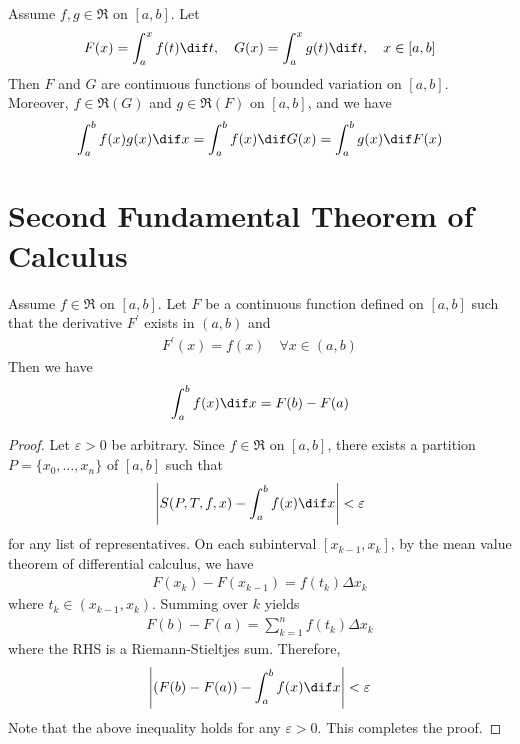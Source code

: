 \documentclass[thmcnt=section, color=blue, 12pt]{my-elegantbook}
\begin{document}
\begin{theorem}
	Assume $f, g \in \mathfrak{R}$ on $[a, b]$.
	Let
	\begin{align*}
		F(x) = \int_a^x f(t) \dif t, \quad
		G(x) = \int_a^x g(t) \dif t, \quad
		x \in [a, b]
	\end{align*}
	Then $F$ and $G$ are continuous functions of bounded variation on $[a, b]$.
	Moreover, $f \in \mathfrak{R}(G)$ and $g \in \mathfrak{R}(F)$ on $[a, b]$,
	and we have
	\begin{align*}
		\int_a^b f(x) g(x) \dif x
		= \int_a^b f(x) \dif G(x)
		= \int_a^b g(x) \dif F(x)
	\end{align*}
\end{theorem}



\section{Second Fundamental Theorem of Calculus}

\begin{theorem} \label{thm:22}
	Assume $f \in \mathfrak{R}$ on $[a, b]$.
	Let $F$ be a continuous function defined on $[a, b]$
	such that the derivative $F^\prime$ exists in $(a, b)$ and
	\begin{align*}
		F^\prime(x) = f(x) \quad \forall x \in (a, b)
	\end{align*}
	Then we have
	\begin{align*}
		\int_a^b f(x) \dif x
		= F(b) - F(a)
	\end{align*}
\end{theorem}

\begin{proof}
	Let $\varepsilon > 0$ be arbitrary.
	Since $f \in \mathfrak{R}$ on $[a, b]$,
	there exists a partition $P = \{x_0, \ldots, x_n\}$ of $[a, b]$ such that
	\begin{align*}
		\abs{S(P,T,f,x) - \int_a^b f(x) \dif x} < \varepsilon
	\end{align*}
	for any list of representatives.
	On each subinterval $[x_{k-1}, x_k]$,
	by the mean value theorem of differential calculus,
	we have
	\begin{align*}
		F(x_k) - F(x_{k-1}) = f(t_k) \Delta x_k
	\end{align*}
	where $t_k \in (x_{k-1}, x_k)$.
	Summing over $k$ yields
	\begin{align*}
		F(b) - F(a)
		= \sum_{k=1}^n f(t_k) \Delta x_k
	\end{align*}
	where the RHS is a Riemann-Stieltjes sum.
	Therefore,
	\begin{align*}
		\abs{(F(b) - F(a)) - \int_a^b f(x) \dif x} < \varepsilon
	\end{align*}
	Note that the above inequality holds for any $\varepsilon > 0$.
	This completes the proof.
\end{proof}
\end{document}
